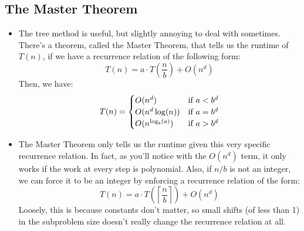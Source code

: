 \subsection{The Master Theorem}
\begin{itemize}
	\item The tree method is useful, but slightly annoying to deal with sometimes. There's a theorem, called the Master Theorem, 
		that tells us the runtime of \( T(n) \), if we have a recurrence relation of the following form:
		\[
		T(n) = a \cdot T\left( \frac{n}{b} \right) + O(n^{d})
		\] 
		Then, we have:
		\[
		T(n) = \begin{cases}
			O(n^{d}) & \text{if \( a < b^{d} \)}\\
			O(n^{d} \log(n)) & \text{if \( a = b^{d} \)}\\
			O(n^{\log_b(a)}) & \text{if \( a > b^{d} \)}
		\end{cases}
		\] 
	\item The Master Theorem only tells us the runtime given this very specific recurrence relation. In fact, as you'll notice 
		with the \( O(n^{d}) \) term, it only works if the work at every step is polynomial. Also, if \( n / b \) is not an 
		integer, we can force it to be an integer by enforcing a recurrence relation of the form:
		\[
		T(n) = a \cdot T\left( \left\lceil \frac{n}{b} \right\rceil  \right) + O(n^{d})
		\] 
		Loosely, this is because constants don't matter, so small shifts (of less than 1) in the subproblem size doesn't really 
		change the recurrence relation at all. 
\end{itemize}

